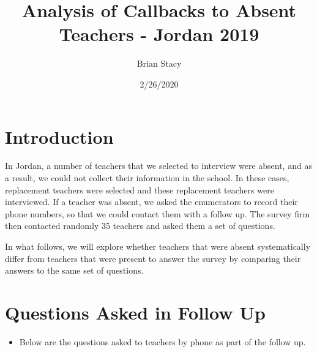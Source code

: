 \documentclass[
]{article}
\title{Analysis of Callbacks to Absent Teachers - Jordan 2019}
\author{Brian Stacy}
\date{2/26/2020}
\providecommand{\tightlist}{%
  \setlength{\itemsep}{0pt}\setlength{\parskip}{0pt}}
\begin{document}
\maketitle

\hypertarget{introduction}{%
\section{Introduction}\label{introduction}}

In Jordan, a number of teachers that we selected to interview were
absent, and as a result, we could not collect their information in the
school. In these cases, replacement teachers were selected and these
replacement teachers were interviewed. If a teacher was absent, we asked
the enumerators to record their phone numbers, so that we could contact
them with a follow up. The survey firm then contacted randomly 35
teachers and asked them a set of questions.

In what follows, we will explore whether teachers that were absent
systematically differ from teachers that were present to answer the
survey by comparing their answers to the same set of questions.

\hypertarget{questions-asked-in-follow-up}{%
\section{Questions Asked in Follow
Up}\label{questions-asked-in-follow-up}}

\begin{itemize}
\tightlist
\item
  Below are the questions asked to teachers by phone as part of the
  follow up.
\end{itemize}
\end{document}
